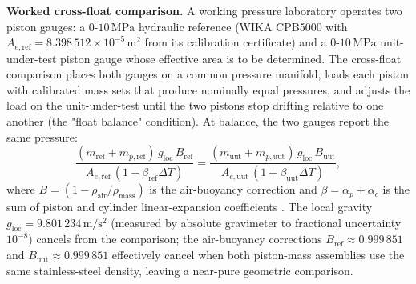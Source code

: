 \textbf{Worked cross-float comparison.} A working pressure
laboratory operates two piston gauges: a $0$-$10\,\si{\mega
\pascal}$ hydraulic reference (WIKA CPB5000 with $A_{e,\text{ref}}
= 8.398\,512 \times 10^{-5}\,\si{\meter\squared}$ from its
calibration certificate) and a $0$-$10\,\si{\mega\pascal}$
unit-under-test piston gauge whose effective area is to be
determined. The cross-float comparison places both gauges on a
common pressure manifold, loads each piston with calibrated mass
sets that produce nominally equal pressures, and adjusts the load
on the unit-under-test until the two pistons stop drifting
relative to one another (the "float balance" condition). At
balance, the two gauges report the same pressure:
\[
\frac{(m_{\text{ref}} + m_{p,\text{ref}})\, g_{\text{loc}}\,
B_{\text{ref}}}{A_{e,\text{ref}}\,(1 + \beta_{\text{ref}} \Delta T)}
= \frac{(m_{\text{uut}} + m_{p,\text{uut}})\, g_{\text{loc}}\,
B_{\text{uut}}}{A_{e,\text{uut}}\,(1 + \beta_{\text{uut}} \Delta T)},
\]
where $B = (1 - \rho_{\text{air}}/\rho_{\text{mass}})$ is the
air-buoyancy correction and $\beta = \alpha_{p} + \alpha_{c}$ is
the sum of piston and cylinder linear-expansion coefficients
\cite{std:ch03t3b-euramet-cg-3}. The local gravity
$g_{\text{loc}} = 9.801\,234\,\si{\meter\per\second\squared}$
(measured by absolute gravimeter to fractional uncertainty $10^{-8}$)
cancels from the comparison; the air-buoyancy corrections
$B_{\text{ref}} \approx 0.999\,851$ and $B_{\text{uut}} \approx
0.999\,851$ effectively cancel when both piston-mass assemblies
use the same stainless-steel density, leaving a near-pure
geometric comparison.

